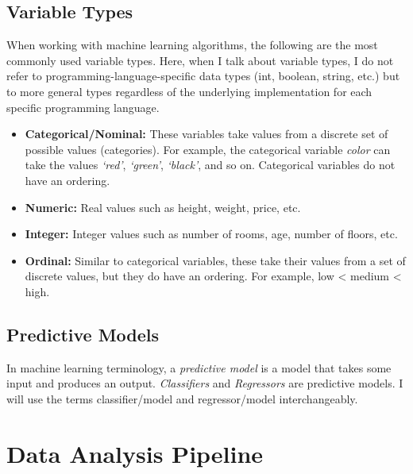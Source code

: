 \documentclass[
  11pt,
]{krantz}
\begin{document}
\hypertarget{variable-types}{%
\subsection{Variable Types}\label{variable-types}}

When working with machine learning algorithms, the following are the most commonly used variable types. Here, when I talk about variable types, I do not refer to programming-language-specific data types (int, boolean, string, etc.) but to more general types regardless of the underlying implementation for each specific programming language.

\begin{itemize}
\item
  \textbf{Categorical/Nominal:} These variables take values from a discrete set of possible values (categories). For example, the categorical variable \emph{color} can take the values \emph{`red'}, \emph{`green'}, \emph{`black'}, and so on. Categorical variables do not have an ordering.
\item
  \textbf{Numeric:} Real values such as height, weight, price, etc.
\item
  \textbf{Integer:} Integer values such as number of rooms, age, number of floors, etc.
\item
  \textbf{Ordinal:} Similar to categorical variables, these take their values from a set of discrete values, but they do have an ordering. For example, low \textless{} medium \textless{} high.
\end{itemize}

\hypertarget{predictive-models}{%
\subsection{Predictive Models}\label{predictive-models}}

In machine learning terminology, a \emph{predictive model} is a model that takes some input and produces an output. \emph{Classifiers} and \emph{Regressors} are predictive models. I will use the terms classifier/model and regressor/model interchangeably.

\hypertarget{pipeline}{%
\section{Data Analysis Pipeline}\label{pipeline}}
\end{document}

